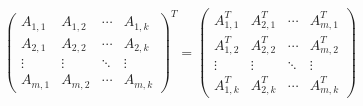 \[
\begin{pmatrix}
  A_{1,1} & A_{1,2} & \cdots & A_{1,k} \\
  A_{2,1} & A_{2,2} & \cdots & A_{2,k} \\
  \vdots  & \vdots  & \ddots & \vdots  \\
  A_{m,1} & A_{m,2} & \cdots & A_{m,k} 
\end{pmatrix}^T
=
\begin{pmatrix}
  A_{1,1}^T & A_{2,1}^T & \cdots & A_{m,1}^T \\
  A_{1,2}^T & A_{2,2}^T & \cdots & A_{m,2}^T \\
  \vdots    & \vdots    & \ddots & \vdots    \\
  A_{1,k}^T & A_{2,k}^T & \cdots & A_{m,k}^T 
\end{pmatrix}
\]
